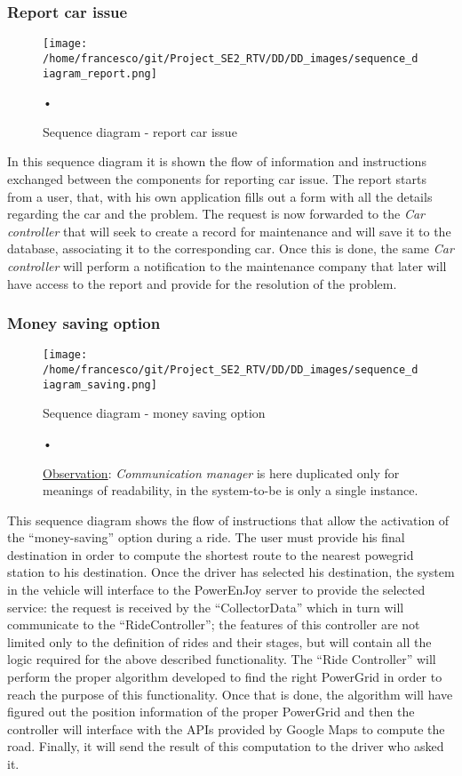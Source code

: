 \documentclass[10pt, a4paper,titlepage]{article}
\begin{document}
\subsubsection{Report car issue}
\begin{figure}[h]
\begin{center}
\texttt{[image: /home/francesco/git/Project\_SE2\_RTV/DD/DD\_images/sequence\_diagram\_report.png]}
\caption{Sequence diagram - report car issue}
\label{fig:sequence_diagram_report}
\end{center}•
\end{figure}
In this sequence diagram it is shown the flow of information and instructions exchanged between the components for reporting car issue.
The report starts from a user, that, with his own application fills out a form with all the details regarding the car and the problem.
The request is now forwarded to the \emph{Car controller} that will seek to create a record for maintenance and will save it to the database, associating it to the corresponding car.
Once this is done, the same \emph{Car controller} will perform a notification to the maintenance company that later will have access to the report and provide for the resolution of the problem.
\subsubsection{Money saving option}
\begin{figure}[h]
\begin{center}
\texttt{[image: /home/francesco/git/Project\_SE2\_RTV/DD/DD\_images/sequence\_diagram\_saving.png]}
\caption{Sequence diagram - money saving option}
\caption*{\underline{Observation}: \emph{Communication manager} is here duplicated only for meanings of readability, in the system-to-be is only a single instance.}
\label{fig:sequence_diagram_saving}
\end{center}•
\end{figure}
This sequence diagram shows the flow of instructions that allow the activation of the “money-saving” option during a ride.
The user must provide his final destination in order to compute the shortest route to the nearest powegrid station to his destination.
Once the driver has selected his destination, the system in the vehicle will interface to the PowerEnJoy server to provide the selected service: the request is received by the “CollectorData” which in turn will communicate to the “RideController”; the features of this controller are not limited only to the definition of rides and their stages, but will contain all the logic required for the above described functionality.
The “Ride Controller” will perform the proper algorithm developed to find the right PowerGrid in order to reach the purpose of this functionality. Once that is done, the algorithm will have figured out the position information of the proper PowerGrid and then the controller will interface with the APIs provided by Google Maps to compute the road.
Finally, it will send the result of this computation to the driver who asked it.
\clearpage
\end{document}
